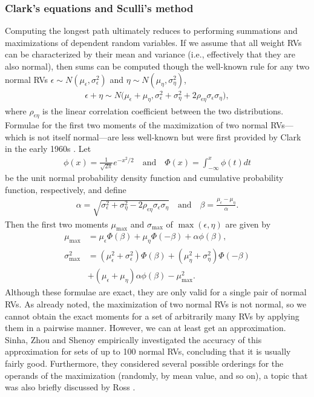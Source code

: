 \documentclass[12pt]{article}
\begin{document}
\subsubsection{Clark's equations and Sculli's method}
\label{subsubsect.clark_sculli}

Computing the longest path ultimately reduces to performing summations and maximizations of dependent random variables. If we assume that all weight RVs can be characterized by their mean and variance (i.e., effectively that they are also normal), then sums can be computed though the well-known rule for any two normal RVs $\epsilon \sim N(\mu_\epsilon, \sigma_\epsilon^2)$ and $\eta \sim N(\mu_\eta, \sigma_\eta^2)$,
\begin{align}
\label{eq.sum_moments}
\epsilon + \eta \sim N \big(\mu_\epsilon + \mu_\eta, \sigma_\epsilon^2 + \sigma_\eta^2 + 2 \rho_{\epsilon\eta}\sigma_\epsilon \sigma_\eta \big), 
\end{align}
where $\rho_{\epsilon\eta}$ is the linear correlation coefficient between the two distributions. Formulae for the first two moments of the maximization of two normal RVs---which is not itself normal---are less well-known but were first provided by Clark in the early 1960s \cite{cla61}. Let 
\begin{align*}
\phi(x) = \frac{1}{\sqrt{2\pi}} e^{-x^2/2} \quad \text{and} \quad \Phi(x) = \int_{-\infty}^{x} \phi(t) dt
\end{align*}
be the unit normal probability density function and cumulative probability function, respectively, and define 
\begin{align}
  \label{eq.alpha_beta}
\alpha = \sqrt{\sigma_\epsilon^2 + \sigma_\eta^2 - 2 \rho_{\epsilon\eta}\sigma_\epsilon \sigma_\eta} \quad \text{and} \quad \beta = \frac{\mu_\epsilon - \mu_\eta}{\alpha}. 
\end{align}
Then the first two moments $\mu_{\max}$ and $\sigma_{\max}$ of $\max(\epsilon, \eta)$ are given by
\begin{align}
\mu_{\max} &= \mu_\epsilon \Phi(\beta) + \mu_\eta \Phi(-\beta) + \alpha \phi(\beta), \label{eq.clark_max_mu}\\
\sigma_{\max}^2 &= (\mu_\epsilon^2 + \sigma_\epsilon^2) \Phi(\beta) + (\mu_\eta^2 + \sigma_\eta^2) \Phi(-\beta) \label{eq.clark_max_sigma}\\
&+ (\mu_\epsilon + \mu_\eta)\alpha\phi(\beta) -\mu_{\max}^2 \nonumber.
\end{align}
Although these formulae are exact, they are only valid for a single pair of normal RVs. As already noted, the maximization of two normal RVs is not normal, so we cannot obtain the exact moments for a set of arbitrarily many RVs by applying them in a pairwise manner. However, we can at least get an approximation. Sinha, Zhou and Shenoy \cite{sin07} empirically investigated the accuracy of this approximation for sets of up to 100 normal RVs, concluding that it is usually fairly good. Furthermore, they considered several possible orderings for the operands of the maximization (randomly, by mean value, and so on), a topic that was also briefly discussed by Ross \cite{ross03}.        
\end{document}
